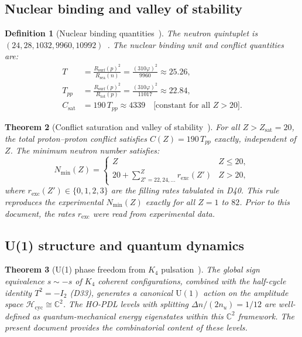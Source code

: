 \documentclass[12pt,a4paper]{article}
\newtheorem{theorem}{Theorem}[section]
\newtheorem{definition}[theorem]{Definition}
\newcommand{\Kfour}{K_4}
\newcommand{\nquintuplet}{(24,28,1032,9960,10992)}
\newcommand{\nuu}{n_u}
\newcommand{\Dn}{\Delta n}
\newcommand{\Rsea}{R_{\mathrm{sea}}}
\newcommand{\Rtot}{R_{\mathrm{tot}}}
\newcommand{\Rsurf}{R_{\mathrm{surf}}}
\newcommand{\vp}{\varphi}
\newcommand{\Tpdl}{T}
\newcommand{\Tpp}{T_{pp}}
\newcommand{\Csat}{C_{\mathrm{sat}}}
\newcommand{\Nmin}{N_{\min}}
\newcommand{\rexc}{r_{\mathrm{exc}}}
\newcommand{\Zsat}{Z_{\mathrm{sat}}}
\begin{document}
\subsection{Nuclear binding and valley of stability}

\begin{definition}[Nuclear binding quantities~{\cite{PDL_D22_2026,PDL_D40_2026}}]
\label{def:binding}
The neutron quintuplet is \\ $\nquintuplet$~\cite{PDL_D22_2026}. The nuclear binding unit and conflict quantities are:
\begin{align}
\Tpdl &= \frac{\Rsurf(p)^2}{\Rsea(n)} = \frac{(310\vp)^2}{9960} \approx 25.26, \\
\Tpp &= \frac{\Rsurf(p)^2}{\Rtot(p)} = \frac{(310\vp)^2}{11017} \approx 22.84, \\
\Csat &= 190\,\Tpp \approx 4339 \quad \text{[constant for all } Z > 20\text{]}.
\end{align}
\end{definition}

\begin{theorem}[Conflict saturation and valley of stability~{\cite{PDL_D40_2026}}]
\label{thm:D40}
For all $Z > \Zsat = 20$, the total proton--proton conflict satisfies $C(Z) = 190\,\Tpp$ exactly, independent of $Z$. The minimum neutron number satisfies:
\begin{equation}
\Nmin(Z) = \begin{cases} Z & Z \leq 20, \\ 20 + \displaystyle\sum_{Z'=22,24,\ldots}^{Z} \rexc(Z') & Z > 20, \end{cases}
\label{eq:valley}
\end{equation}
where $\rexc(Z') \in \{0,1,2,3\}$ are the filling rates tabulated in D40. This rule reproduces the experimental $\Nmin(Z)$ exactly for all $Z = 1$ to $82$. Prior to this document, the rates $\rexc$ were read from experimental data.
\end{theorem}

\subsection{U(1) structure and quantum dynamics}

\begin{theorem}[U(1) phase freedom from $K_4$ pulsation~{\cite{PDL_D46_2026}}]
\label{thm:D46}
The global sign equivalence $s \sim -s$ of $\Kfour$ coherent configurations, combined with the half-cycle identity $T^2 = -I_2$ (D33), generates a canonical $\mathrm{U}(1)$ action on the amplitude space $\mathcal{H}_{\mathrm{cyc}} \cong \mathbb{C}^2$. The HO-PDL levels with splitting $\Dn/(2\nuu) = 1/12$ are well-defined as quantum-mechanical energy eigenstates within this $\mathbb{C}^2$ framework. The present document provides the combinatorial content of these levels.
\end{theorem}
\end{document}
